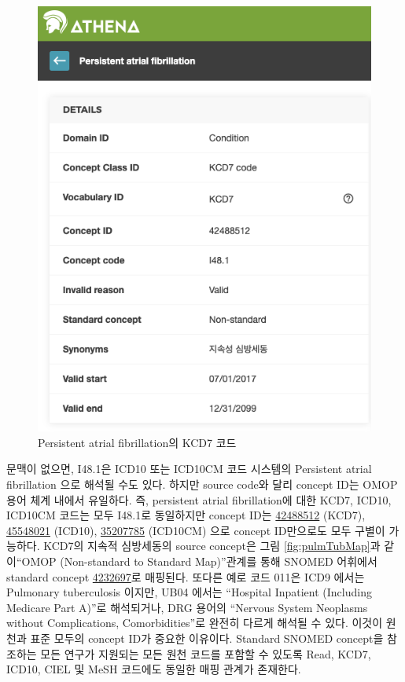 \documentclass[10.5pt]{book}
\theoremstyle{definition}
\theoremstyle{definition}
\theoremstyle{definition}
\theoremstyle{remark}
\begin{document}
\begin{figure}

{\centering \includegraphics[width=0.75\linewidth]{images/CommonDataModel/AFKCD7} 

}

\caption{Persistent atrial fibrillation의 KCD7 코드}\label{fig:pulmTubICD9}
\end{figure}

문맥이 없으면, I48.1은 ICD10 또는 ICD10CM 코드 시스템의 Persistent
atrial fibrillation 으로 해석될 수도 있다. 하지만 source code와 달리
concept ID는 OMOP 용어 체계 내에서 유일하다. 즉, persistent atrial
fibrillation에 대한 KCD7, ICD10, ICD10CM 코드는 모두 I48.1로 동일하지만
concept ID는
\href{http://athena.ohdsi.org/search-terms/terms/42488512}{42488512}
(KCD7),
\href{http://athena.ohdsi.org/search-terms/terms/45548021}{45548021}
(ICD10),
\href{http://athena.ohdsi.org/search-terms/terms/35207785}{35207785}
(ICD10CM) 으로 concept ID만으로도 모두 구별이 가능하다. KCD7의 지속적
심방세동의 source concept은 그림 \ref{fig:pulmTubMap}과 같이``OMOP
(Non-standard to Standard Map)''관계를 통해 SNOMED 어휘에서 standard
concept
\href{http://athena.ohdsi.org/search-terms/terms/4232697}{4232697}로
매핑된다. 또다른 예로 코드 011은 ICD9 에서는 Pulmonary tuberculosis
이지만, UB04 에서는 ``Hospital Inpatient (Including Medicare Part A)''로
해석되거나, DRG 용어의 ``Nervous System Neoplasms without Complications,
Comorbidities''로 완전히 다르게 해석될 수 있다. 이것이 원천과 표준
모두의 concept ID가 중요한 이유이다. Standard SNOMED concept을 참조하는
모든 연구가 지원되는 모든 원천 코드를 포함할 수 있도록 Read, KCD7,
ICD10, CIEL 및 MeSH 코드에도 동일한 매핑 관계가 존재한다.
\end{document}

